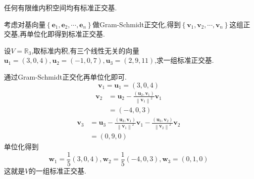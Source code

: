 \begin{green}
    \begin{corollary}[标准正交基的存在性]\label{cor:标准正交基的存在性}
        任何有限维内积空间均有标准正交基.
    \end{corollary}
    \begin{Proof}
        考虑对基向量$\left\{
            \bm{e}_1,\bm{e}_2,\cdots,\bm{e}_n
        \right\}$做\textup{Gram-Schmidt}正交化,得到$\left\{
            \bm{v}_1,\bm{v}_2,\cdots,\bm{v}_n
            \right\}$这组正交基,再单位化即得到标准正交基.
    \end{Proof}
\end{green}
\begin{brown}
    \begin{example}
        设$V=\mathbb{R}_3$,取标准内积,有三个线性无关的向量$\bm{u}_1=\left(3,0,4\right),\bm{u}_2=\left(
            -1,0,7
        \right),\bm{u}_3=\left(
            2,9,11
        \right)$,求一组标准正交基.
    \end{example}\newpage
    \begin{solution}通过\textup{Gram-Schmidt}正交化再单位化即可.
        \[
            \bm{v}_1=\bm{u}_1=\left(
                3,0,4
            \right)
       \]
        \begin{align*}
            \bm{v}_2&=\bm{u}_2-\frac{\left(
                \bm{u}_2,\bm{v}_1
            \right)}{\left\lVert \bm{v}_1\right\rVert ^2}\bm{v}_1\\
            &=\left(-4,0,3\right)
        \end{align*}
        \begin{align*}
            \bm{v}_3&=\bm{u}_3-\frac{\left(
                \bm{u}_3,\bm{v}_1
            \right)}{\left\lVert \bm{v}_1\right\rVert ^2}\bm{v}_1-\frac{\left(
                \bm{u}_3,\bm{v}_2
            \right)}{\left\lVert \bm{v}_2\right\rVert ^2}\bm{v}_2\\
            &=\left(0,9,0\right)
        \end{align*}单位化得到\[
        \bm{w}_1=\frac{1}{5}\left(3,0,4\right),
        \bm{w}_2=\frac{1}{5}\left(-4,0,3\right),
        \bm{w}_3=\left(0,1,0\right)
        \]这就是$V$的一组标准正交基.
    \end{solution}
\end{brown}
